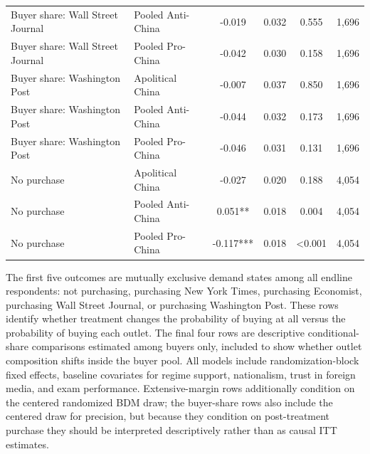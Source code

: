\begin{table}[H]
\begin{threeparttable}
\begin{tabular}{llcccc}
Buyer share: Wall Street Journal & Pooled Anti-China & -0.019 & 0.032 & 0.555 & 1,696 \\
Buyer share: Wall Street Journal & Pooled Pro-China & -0.042 & 0.030 & 0.158 & 1,696 \\
Buyer share: Washington Post & Apolitical China & -0.007 & 0.037 & 0.850 & 1,696 \\
Buyer share: Washington Post & Pooled Anti-China & -0.044 & 0.032 & 0.173 & 1,696 \\
Buyer share: Washington Post & Pooled Pro-China & -0.046 & 0.031 & 0.131 & 1,696 \\
No purchase & Apolitical China & -0.027 & 0.020 & 0.188 & 4,054 \\
No purchase & Pooled Anti-China & 0.051** & 0.018 & 0.004 & 4,054 \\
No purchase & Pooled Pro-China & -0.117*** & 0.018 & <0.001 & 4,054 \\
\bottomrule
\end{tabular}
\begin{tablenotes}[flushleft]
\footnotesize
\item The first five outcomes are mutually exclusive demand states among all endline respondents: not purchasing, purchasing New York Times, purchasing Economist, purchasing Wall Street Journal, or purchasing Washington Post. These rows identify whether treatment changes the probability of buying at all versus the probability of buying each outlet. The final four rows are descriptive conditional-share comparisons estimated among buyers only, included to show whether outlet composition shifts inside the buyer pool. All models include randomization-block fixed effects, baseline covariates for regime support, nationalism, trust in foreign media, and exam performance. Extensive-margin rows additionally condition on the centered randomized BDM draw; the buyer-share rows also include the centered draw for precision, but because they condition on post-treatment purchase they should be interpreted descriptively rather than as causal ITT estimates.
\end{tablenotes}
\end{threeparttable}
\end{table}
